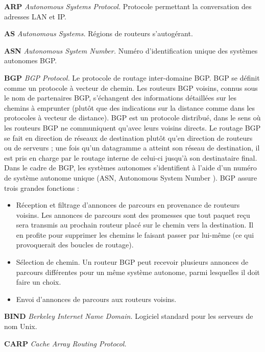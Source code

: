 \textbf{ARP} \textit{Autonomous Systems Protocol.} Protocole permettant la conversation des adresses LAN et IP.



\textbf{AS} \textit{Autonomous Systems.} Régions de routeurs s’autogérant.



\textbf{ASN} \textit{Autonomous System Number.} Numéro d’identification unique des systèmes autonomes BGP.



\textbf{BGP} \textit{BGP Protocol.} Le protocole de routage inter-domaine BGP. BGP se définit comme un protocole à vecteur de chemin. Les routeurs BGP voisins, connus sous le nom de partenaires BGP, s’échangent des informations détaillées sur les chemins à emprunter (plutôt que des indications sur la distance comme dans les protocoles à vecteur de distance). BGP est un protocole distribué, dans le sens où les routeurs BGP ne communiquent qu’avec leurs voisins directs. Le routage BGP se fait en direction de réseaux de destination plutôt qu’en direction de routeurs ou de serveurs ; une fois qu’un datagramme a atteint son réseau de destination, il est pris en charge par le routage interne de celui-ci jusqu’à son destinataire final. Dans le cadre de BGP, les systèmes autonomes s’identifient à l’aide d’un numéro de système autonome unique (ASN, Autonomous System Number ). BGP assure trois grandes fonctions :
\begin{itemize}
	\item Réception et filtrage d’annonces de parcours en provenance de routeurs voisins. Les annonces de parcours sont des promesses que tout paquet reçu sera transmis au prochain routeur placé sur le chemin vers la destination. Il en profite pour supprimer les chemins le faisant passer par lui-même (ce qui provoquerait des boucles de routage).
	\item Sélection de chemin. Un routeur BGP peut recevoir plusieurs annonces de parcours différentes pour un même système autonome, parmi lesquelles il doit faire un choix.
	\item Envoi d’annonces de parcours aux routeurs voisins.
\end{itemize}



\textbf{BIND} \textit{Berkeley Internet Name Domain.} Logiciel standard pour les serveurs de nom Unix.



\textbf{CARP} \textit{Cache Array Routing Protocol.}



